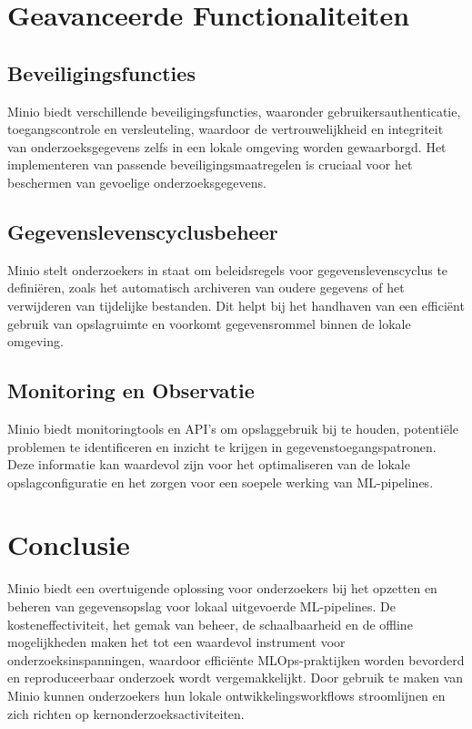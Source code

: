 \section{Geavanceerde Functionaliteiten}

\subsection{Beveiligingsfuncties}
Minio biedt verschillende beveiligingsfuncties, waaronder gebruikersauthenticatie, toegangscontrole en versleuteling, waardoor de vertrouwelijkheid en integriteit van onderzoeksgegevens zelfs in een lokale omgeving worden gewaarborgd. Het implementeren van passende beveiligingsmaatregelen is cruciaal voor het beschermen van gevoelige onderzoeksgegevens.

\subsection{Gegevenslevenscyclusbeheer}
Minio stelt onderzoekers in staat om beleidsregels voor gegevenslevenscyclus te definiëren, zoals het automatisch archiveren van oudere gegevens of het verwijderen van tijdelijke bestanden. Dit helpt bij het handhaven van een efficiënt gebruik van opslagruimte en voorkomt gegevensrommel binnen de lokale omgeving.

\subsection{Monitoring en Observatie}
Minio biedt monitoringtools en API's om opslaggebruik bij te houden, potentiële problemen te identificeren en inzicht te krijgen in gegevenstoegangspatronen. Deze informatie kan waardevol zijn voor het optimaliseren van de lokale opslagconfiguratie en het zorgen voor een soepele werking van ML-pipelines.

\section{Conclusie}

Minio biedt een overtuigende oplossing voor onderzoekers bij het opzetten en beheren van gegevensopslag voor lokaal uitgevoerde ML-pipelines. De kosteneffectiviteit, het gemak van beheer, de schaalbaarheid en de offline mogelijkheden maken het tot een waardevol instrument voor onderzoeksinspanningen, waardoor efficiënte MLOps-praktijken worden bevorderd en reproduceerbaar onderzoek wordt vergemakkelijkt. Door gebruik te maken van Minio kunnen onderzoekers hun lokale ontwikkelingsworkflows stroomlijnen en zich richten op kernonderzoeksactiviteiten.
